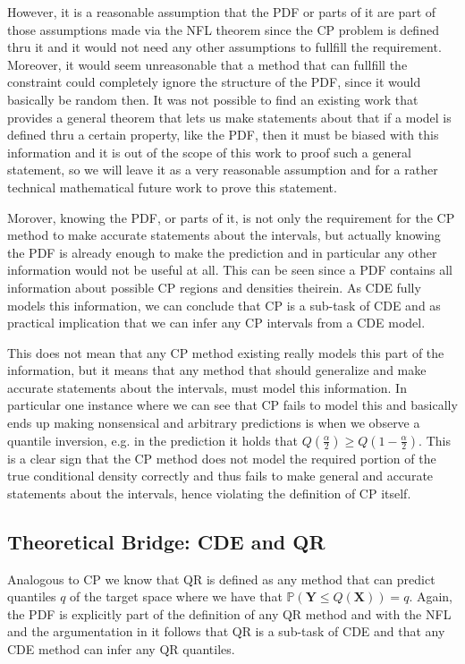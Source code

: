 However, it is a reasonable assumption that the PDF or parts of it are part of those assumptions made via the NFL theorem since the CP problem is defined thru it and it would not need any other assumptions to fullfill the requirement. Moreover, it would seem unreasonable that a method that can fullfill the constraint could completely ignore the structure of the PDF, since it would basically be random then. It was not possible to find an existing work that provides a general theorem that lets us make statements about that if a model is defined thru a certain property, like the PDF, then it must be biased with this information and it is out of the scope of this work to proof such a general statement, so we will leave it as a very reasonable assumption and for a rather technical mathematical future work to prove this statement.

Morover, knowing the PDF, or parts of it, is not only the requirement for the CP method to make accurate statements about the intervals, but actually knowing the PDF is already enough to make the prediction and in particular any other information would not be useful at all. This can be seen since a PDF contains all information about possible CP regions and densities theirein. As CDE fully models this information, we can conclude that CP is a sub-task of CDE and as practical implication that we can infer any CP intervals from a CDE model.

This does not mean that any CP method existing really models this part of the information, but it means that any method that should generalize and make accurate statements about the intervals, must model this information. In particular one instance where we can see that CP fails to model this and basically ends up making nonsensical and arbitrary predictions is when we observe a quantile inversion, e.g. in the prediction it holds that $Q(\frac{\alpha}{2}) \geq Q(1-\frac{\alpha}{2})$. This is a clear sign that the CP method does not model the required portion of the true conditional density correctly and thus fails to make general and accurate statements about the intervals, hence violating the definition of CP itself.

\subsection{Theoretical Bridge: CDE and QR}\label{sec:bridge_cde_qr}

Analogous to CP we know that QR is defined as any method that can predict quantiles $q$ of the target space where we have that $\mathbb{P}(\mathbf{Y} \leq Q(\mathbf{X})) = q$. Again, the PDF is explicitly part of the definition of any QR method and with the NFL and the argumentation in  it follows that QR is a sub-task of CDE and that any CDE method can infer any QR quantiles.

